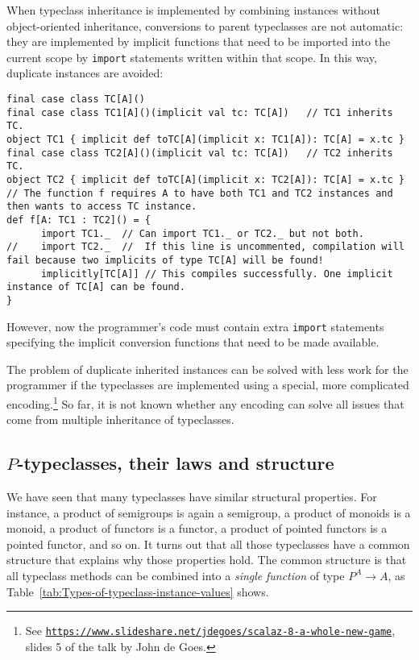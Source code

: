 When typeclass inheritance is implemented by combining instances without
object-oriented inheritance, conversions to parent typeclasses are
not automatic: they are implemented by implicit functions that need
to be imported into the current scope by \lstinline!import! statements
written within that scope. In this way, duplicate instances are avoided:
\begin{lstlisting}
final case class TC[A]()
final case class TC1[A]()(implicit val tc: TC[A])   // TC1 inherits TC.
object TC1 { implicit def toTC[A](implicit x: TC1[A]): TC[A] = x.tc }
final case class TC2[A]()(implicit val tc: TC[A])   // TC2 inherits TC.
object TC2 { implicit def toTC[A](implicit x: TC2[A]): TC[A] = x.tc }
// The function f requires A to have both TC1 and TC2 instances and then wants to access TC instance.
def f[A: TC1 : TC2]() = {
      import TC1._  // Can import TC1._ or TC2._ but not both.
//    import TC2._  //  If this line is uncommented, compilation will fail because two implicits of type TC[A] will be found!
      implicitly[TC[A]] // This compiles successfully. One implicit instance of TC[A] can be found.
}
\end{lstlisting}
However, now the programmer\textsf{'}s code must contain extra \lstinline!import!
statements specifying the implicit conversion functions that need
to be made available.

The problem of duplicate inherited instances can be solved with less
work for the programmer if the typeclasses are implemented using a
special, more complicated encoding.\footnote{See \texttt{\href{https://www.slideshare.net/jdegoes/scalaz-8-a-whole-new-game}{https://www.slideshare.net/jdegoes/scalaz-8-a-whole-new-game}},
slides 5 of the talk by John de
Goes.} So far, it is not known whether any encoding can solve all issues
that come from multiple inheritance of typeclasses.

\subsection{$P$-typeclasses, their laws and structure\label{subsec:P-typeclasses}}

We have seen that many typeclasses have similar structural properties.
For instance, a product of semigroups is again a semigroup, a product
of monoids is a monoid, a product of functors is a functor, a product
of pointed functors is a pointed functor, and so on. It turns out
that all those typeclasses have a common structure that explains why
those properties hold. The common structure is that all typeclass
methods can be combined into a \emph{single} \emph{function} of type
$P^{A}\rightarrow A$, as Table~\ref{tab:Types-of-typeclass-instance-values}
shows.

